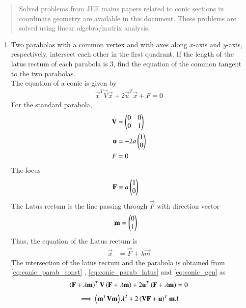 \documentclass[journal,12pt,twocolumn]{IEEEtran}
\begin{document}
\begin{abstract}
	Solved problems from JEE mains papers related to conic sections in coordinate geometry are 
available in this document.  These problems are solved using linear algebra/matrix analysis.
\end{abstract}
\begin{enumerate}[label=\arabic*]
\item Two parabolas with a common vertex and with axes along $x$-axis and $y$-axis, respectively, intersect 
each other in the first quadrant.  If the length of the latus rectum of each parabola is 3, find the equation 
of the common tangent to the two parabolas.
\\
\solution The equation of a conic is given by 
%
\begin{align}
\label{eq:conic_gen}
\vec{x}^T\vec{V}\vec{x}+2\vec{u}^T\vec{x}+F=0
\end{align}
%
For the standard parabola, 
\begin{align}
\label{eq:conic_parab_V}
\mathbf{V}&=\begin{pmatrix}0 & 0 \\ 0& 1\end{pmatrix}
\\
\mathbf{u}&=-2a\begin{pmatrix}1 \\ 0\end{pmatrix}
\label{eq:conic_parab_u}
\\
F&=0
\label{eq:conic_parab_const}
\end{align}
%
The focus
\begin{align}
\label{eq:conic_parab_focus}
\mathbf{F}&=a\begin{pmatrix}1 \\ 0\end{pmatrix}
\end{align}
%
The Latus rectum is the line passing through $\vec{F}$ with direction vector 
\begin{align}
\label{eq:conic_parab_latus_m}
\mathbf{m}&=\begin{pmatrix}0 \\ 1\end{pmatrix}
\end{align}
%
Thus, the equation of the Latus rectum is 
\begin{align}
\label{eq:conic_parab_latus}
\vec{x}&= \vec{F}+\lambda \vec{m}
\end{align}
%
The intersection of the latus rectum and the parabola is obtained from \eqref{eq:conic_parab_const}
, \eqref{eq:conic_parab_latus}
and \eqref{eq:conic_gen} as
\begin{align}
\left(\mathbf{F}+\lambda \mathbf{m}\right)^T\mathbf{V}\left(\mathbf{F}+\lambda \mathbf{m}\right)+2\mathbf{u}^T\left(\mathbf{F}+\lambda \mathbf{m}\right)=0
\end{align}
\begin{multline}
\label{eq:conic_parab_lam_quad}
\implies \brak{\vec{m}^T\vec{V}\vec{m}}\lambda^2+2\brak{\vec{V}\vec{F}+\vec{u}}^T\vec{m}\lambda 

\end{multline}
\end{enumerate}
\end{document}

